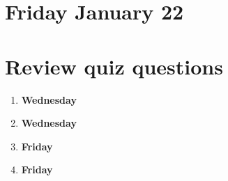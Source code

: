 \documentclass[12pt, oneside]{article}
\begin{document}












\newpage
\section*{Friday January 22}







\newpage



\section*{Review quiz questions}
\begin{enumerate}
\item {\bf Wednesday}




\item {\bf Wednesday} 

\newpage
\item {\bf Friday} 


\item {\bf Friday} 



\end{enumerate}
\end{document}
